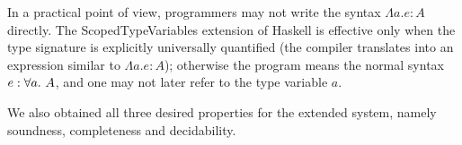 In a practical point of view, programmers may not write the syntax $\Lambda a. e : A$ directly.
The ScopedTypeVariables extension of Haskell is effective only
when the type signature is explicitly universally quantified
(the compiler translates into an expression similar to $\Lambda a. e : A$);
otherwise the program means the normal syntax $e : \all A$,
and one may not later refer to the type variable $a$.

We also obtained all three desired properties for the extended system,
namely soundness, completeness and decidability.

